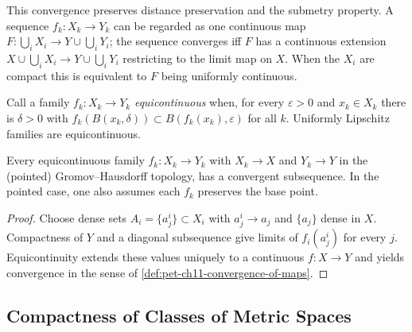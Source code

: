 \begin{remark}
  \label{rem:pet-ch11-map-convergence-as-extension}

  This convergence preserves distance preservation and the submetry property. A
  sequence $f_k:X_k\to Y_k$ can be regarded as one continuous map
  $F:\bigcup_iX_i\to Y\cup\bigcup_iY_i$; the sequence converges iff $F$ has a
  continuous extension $X\cup\bigcup_iX_i\to Y\cup\bigcup_iY_i$ restricting to
  the limit map on $X$. When the $X_i$ are compact this is equivalent to $F$
  being uniformly continuous.
\end{remark}

\begin{definition}
  \label{def:pet-ch11-equicontinuous-family}

  Call a family $f_k:X_k\to Y_k$ \emph{equicontinuous} when, for every
  $\varepsilon>0$ and $x_k\in X_k$ there is $\delta>0$ with
  $f_k(B(x_k,\delta))\subset B(f_k(x_k),\varepsilon)$ for all $k$. Uniformly
  Lipschitz families are equicontinuous.
\end{definition}

\begin{lemma}
  \label{lem:pet-ch11-arzela-ascoli-gh}

  Every equicontinuous family $f_k:X_k\to Y_k$ with $X_k\to X$ and $Y_k\to Y$
  in the (pointed) Gromov--Hausdorff topology, has a convergent subsequence.
  In the pointed case, one also assumes each $f_k$ preserves the base point.
\end{lemma}
\begin{proof}
  \sketch
  Choose dense sets \(A_i=\{a_j^i\}\subset X_i\) with \(a_j^i\to a_j\) and \(\{a_j\}\) dense in \(X\). Compactness of \(Y\) and a diagonal subsequence give limits of \(f_i(a_j^i)\) for every \(j\). Equicontinuity extends these values uniquely to a continuous \(f:X\to Y\) and yields convergence in the sense of \cref{def:pet-ch11-convergence-of-maps}.
\end{proof}


\subsection{Compactness of Classes of Metric Spaces}

